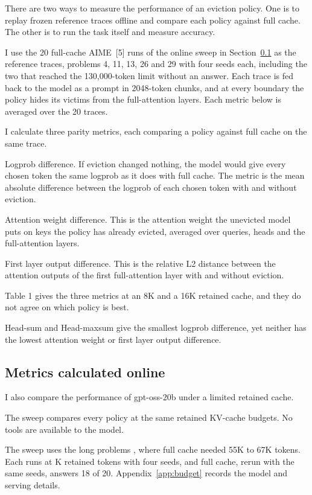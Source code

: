 \documentclass[10pt,letterpaper]{article}
\newcommand{\term}[1]{{\fontseries{b}\selectfont #1}}
\begin{document}
There are two ways to measure the performance of an eviction policy.
One is to replay frozen reference traces offline and compare each policy against full cache.
The other is to run the task itself and measure accuracy.

I use the 20 full-cache AIME~[5] runs of the online sweep in Section~\ref{sec:online} as the reference traces, problems 4, 11, 13, 26 and 29 with four seeds each, including the two that reached the 130,000-token limit without an answer.
Each trace is fed back to the model as a prompt in 2048-token chunks, and at every boundary the policy hides its victims from the full-attention layers.
Each metric below is averaged over the 20 traces.

I calculate three parity metrics, each comparing a policy against full cache on the same trace.

\term{Logprob difference.}
If eviction changed nothing, the model would give every chosen token the same logprob as it does with full cache.
The metric is the mean absolute difference between the logprob of each chosen token with and without eviction.

\term{Attention weight difference.}
This is the attention weight the unevicted model puts on keys the policy has already evicted, averaged over queries, heads and the full-attention layers.

\term{First layer output difference.}
This is the relative L2 distance between the attention outputs of the first full-attention layer with and without eviction.



Table 1 gives the three metrics at an 8K and a 16K retained cache, and they do not agree on which policy is best.

Head-sum and Head-maxsum give the smallest logprob difference, yet neither has the lowest attention weight or first layer output difference.


\subsection{Metrics calculated online}
\label{sec:online}

I also compare the performance of gpt-oss-20b under a limited retained cache.

The sweep compares every policy at the same retained KV-cache budgets.
No tools are available to the model.

The sweep uses the long problems \AimeProblems{}, where full cache needed 55K to 67K tokens.
Each runs at \AimeBudgets{}K retained tokens with four seeds, and full cache, rerun with the same seeds, answers 18 of 20.
Appendix~\ref{app:budget} records the model and serving details.
\end{document}
